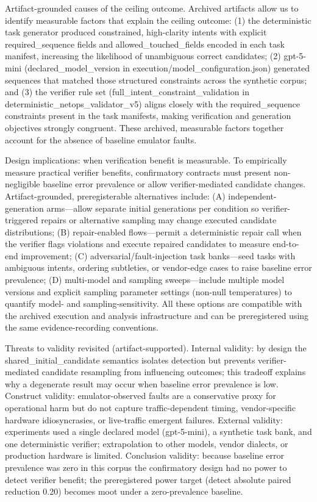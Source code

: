 \documentclass[conference]{IEEEtran}
\begin{document}
Artifact-grounded causes of the ceiling outcome. Archived artifacts allow us to identify measurable factors that explain the ceiling outcome: (1) the deterministic task generator produced constrained, high-clarity intents with explicit required\_sequence fields and allowed\_touched\_fields encoded in each task manifest, increasing the likelihood of unambiguous correct candidates; (2) gpt-5-mini (declared\_model\_version in execution/model\_configuration.json) generated sequences that matched those structured constraints across the synthetic corpus; and (3) the verifier rule set (full\_intent\_constraint\_validation in deterministic\_netops\_validator\_v5) aligns closely with the required\_sequence constraints present in the task manifests, making verification and generation objectives strongly congruent. These archived, measurable factors together account for the absence of baseline emulator faults.

Design implications: when verification benefit is measurable. To empirically measure practical verifier benefits, confirmatory contracts must present non-negligible baseline error prevalence or allow verifier-mediated candidate changes. Artifact-grounded, preregisterable alternatives include: (A) independent-generation arms---allow separate initial generations per condition so verifier-triggered repairs or alternative sampling may change executed candidate distributions; (B) repair-enabled flows---permit a deterministic repair call when the verifier flags violations and execute repaired candidates to measure end-to-end improvement; (C) adversarial/fault-injection task banks---seed tasks with ambiguous intents, ordering subtleties, or vendor-edge cases to raise baseline error prevalence; (D) multi-model and sampling sweeps---include multiple model versions and explicit sampling parameter settings (non-null temperatures) to quantify model- and sampling-sensitivity. All these options are compatible with the archived execution and analysis infrastructure and can be preregistered using the same evidence-recording conventions.

Threats to validity revisited (artifact-supported). Internal validity: by design the shared\_initial\_candidate semantics isolates detection but prevents verifier-mediated candidate resampling from influencing outcomes; this tradeoff explains why a degenerate result may occur when baseline error prevalence is low. Construct validity: emulator-observed faults are a conservative proxy for operational harm but do not capture traffic-dependent timing, vendor-specific hardware idiosyncrasies, or live-traffic emergent failures. External validity: experiments used a single declared model (gpt-5-mini), a synthetic task bank, and one deterministic verifier; extrapolation to other models, vendor dialects, or production hardware is limited. Conclusion validity: because baseline error prevalence was zero in this corpus the confirmatory design had no power to detect verifier benefit; the preregistered power target (detect absolute paired reduction 0.20) becomes moot under a zero-prevalence baseline.
\end{document}
